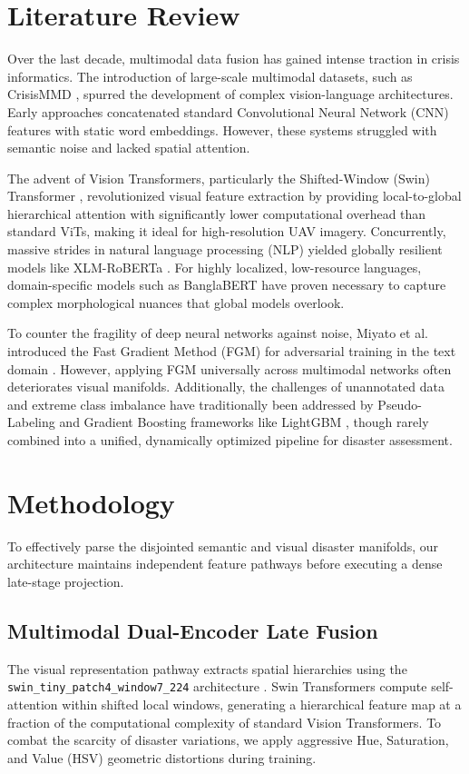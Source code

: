 \documentclass[twoside,twocolumn,10pt]{article}
\begin{document}
\section{Literature Review}
\fontsize{11}{13}\selectfont

Over the last decade, multimodal data fusion has gained intense traction in crisis informatics. The introduction of large-scale multimodal datasets, such as CrisisMMD \cite{crisismmd}, spurred the development of complex vision-language architectures. Early approaches concatenated standard Convolutional Neural Network (CNN) features with static word embeddings. However, these systems struggled with semantic noise and lacked spatial attention.

The advent of Vision Transformers, particularly the Shifted-Window (Swin) Transformer \cite{swin}, revolutionized visual feature extraction by providing local-to-global hierarchical attention with significantly lower computational overhead than standard ViTs, making it ideal for high-resolution UAV imagery. Concurrently, massive strides in natural language processing (NLP) yielded globally resilient models like XLM-RoBERTa \cite{xlmr}. For highly localized, low-resource languages, domain-specific models such as BanglaBERT \cite{banglabert} have proven necessary to capture complex morphological nuances that global models overlook.

To counter the fragility of deep neural networks against noise, Miyato et al. introduced the Fast Gradient Method (FGM) for adversarial training in the text domain \cite{fgm}. However, applying FGM universally across multimodal networks often deteriorates visual manifolds. Additionally, the challenges of unannotated data and extreme class imbalance have traditionally been addressed by Pseudo-Labeling \cite{pseudo} and Gradient Boosting frameworks like LightGBM \cite{lightgbm}, though rarely combined into a unified, dynamically optimized pipeline for disaster assessment.

\section{Methodology}
\fontsize{11}{13}\selectfont

To effectively parse the disjointed semantic and visual disaster manifolds, our architecture maintains independent feature pathways before executing a dense late-stage projection.

\subsection{Multimodal Dual-Encoder Late Fusion}
The visual representation pathway extracts spatial hierarchies using the \texttt{swin\_tiny\_patch4\_window7\_224} architecture \cite{swin}. Swin Transformers compute self-attention within shifted local windows, generating a hierarchical feature map at a fraction of the computational complexity of standard Vision Transformers. To combat the scarcity of disaster variations, we apply aggressive Hue, Saturation, and Value (HSV) geometric distortions during training. 
\end{document}
